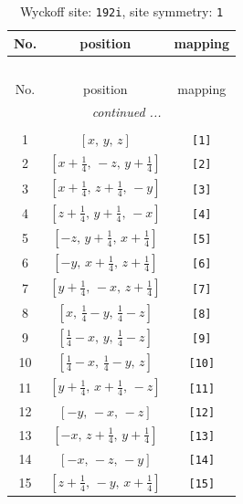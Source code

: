 \documentclass[fleqn,8pt]{jsarticle}
\begin{document}
\renewcommand{\arraystretch}{1.2}
\begin{longtable}{ccc}
\caption{Wyckoff site: {\tt 192i}, site symmetry: {\tt 1}}
 \\
 \hline \hline
No. & position & mapping \\ \hline \endfirsthead

\multicolumn{2}{l}{\tablename\ \thetable{}} \\
 \hline \hline
No. & position & mapping \\ \hline \endhead

 \hline \hline
\multicolumn{2}{r}{\footnotesize\it continued ...} \\ \endfoot

 \hline \hline
\multicolumn{2}{r}{} \\ \endlastfoot

1 & $\left[ x,\, y,\, z \right]$ & {\tt [1]} \\ \hline
2 & $\left[ x + \frac{1}{4},\, - z,\, y + \frac{1}{4} \right]$ & {\tt [2]} \\ \hline
3 & $\left[ x + \frac{1}{4},\, z + \frac{1}{4},\, - y \right]$ & {\tt [3]} \\ \hline
4 & $\left[ z + \frac{1}{4},\, y + \frac{1}{4},\, - x \right]$ & {\tt [4]} \\ \hline
5 & $\left[ - z,\, y + \frac{1}{4},\, x + \frac{1}{4} \right]$ & {\tt [5]} \\ \hline
6 & $\left[ - y,\, x + \frac{1}{4},\, z + \frac{1}{4} \right]$ & {\tt [6]} \\ \hline
7 & $\left[ y + \frac{1}{4},\, - x,\, z + \frac{1}{4} \right]$ & {\tt [7]} \\ \hline
8 & $\left[ x,\, \frac{1}{4} - y,\, \frac{1}{4} - z \right]$ & {\tt [8]} \\ \hline
9 & $\left[ \frac{1}{4} - x,\, y,\, \frac{1}{4} - z \right]$ & {\tt [9]} \\ \hline
10 & $\left[ \frac{1}{4} - x,\, \frac{1}{4} - y,\, z \right]$ & {\tt [10]} \\ \hline
11 & $\left[ y + \frac{1}{4},\, x + \frac{1}{4},\, - z \right]$ & {\tt [11]} \\ \hline
12 & $\left[ - y,\, - x,\, - z \right]$ & {\tt [12]} \\ \hline
13 & $\left[ - x,\, z + \frac{1}{4},\, y + \frac{1}{4} \right]$ & {\tt [13]} \\ \hline
14 & $\left[ - x,\, - z,\, - y \right]$ & {\tt [14]} \\ \hline
15 & $\left[ z + \frac{1}{4},\, - y,\, x + \frac{1}{4} \right]$ & {\tt [15]} \\ \hline

\end{longtable}
\end{document}
